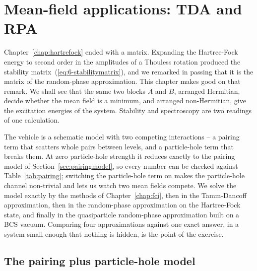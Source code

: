 \chapter{Mean-field applications: TDA and RPA}
\label{chap:mfapplications}

Chapter~\ref{chap:hartrefock} ended with a matrix.  Expanding the
Hartree-Fock energy to second order in the amplitudes of a Thouless rotation
produced the stability matrix~(\ref{eq:6-stabilitymatrix}), and we remarked in
passing that it is the matrix of the random-phase approximation.  This chapter
makes good on that remark.  We shall see that the same two blocks $A$ and $B$,
arranged Hermitian, decide whether the mean field is a minimum, and arranged
non-Hermitian, give the excitation energies of the system.  Stability and
spectroscopy are two readings of one calculation.

The vehicle is a schematic model with two competing interactions -- a pairing
term that scatters whole pairs between levels, and a particle-hole term that
breaks them.  At zero particle-hole strength it reduces exactly to the pairing
model of Section~\ref{sec:pairingmodel}, so every number can be checked
against Table~\ref{tab:pairing}; switching the particle-hole term on makes the
particle-hole channel non-trivial and lets us watch two mean fields compete.
We solve the model exactly by the methods of Chapter~\ref{chap:fci}, then in
the Tamm-Dancoff approximation, then in the random-phase approximation on the
Hartree-Fock state, and finally in the quasiparticle random-phase
approximation built on a BCS vacuum.  Comparing four approximations against
one exact answer, in a system small enough that nothing is hidden, is the
point of the exercise.

\section{The pairing plus particle-hole model}
\label{sec:pairingphmodel}

